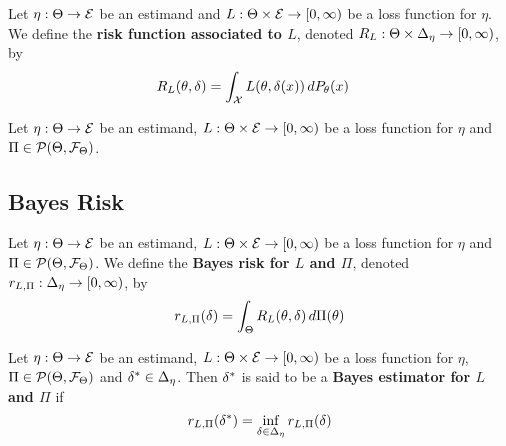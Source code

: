 \documentclass{book}
\begin{document}
	\begin{defn}
		Let $\eta: \Theta \rightarrow \mathcal{E}$ be an estimand and $L: \Theta \times \mathcal{E} \rightarrow [0,\infty)$ be a loss function for $\eta$. We define the \textbf{risk function associated to $L$}, denoted $R_L: \Theta \times \Delta_{\eta} \rightarrow [0,\infty)$, by 
		\begin{align*}
			R_L(\theta, \delta) 
			& = \int_{\mathcal{X}} L(\theta, \delta(x)) \, d P_{\theta}(x)
		\end{align*}
	\end{defn}
	
	\begin{defn}
		Let $\eta: \Theta \rightarrow \mathcal{E}$ be an estimand, $L: \Theta \times \mathcal{E} \rightarrow [0,\infty)$ be a loss function for $\eta$ and $\Pi \in \mathcal{P}(\Theta, \mathcal{F}_{\Theta})$. 
	\end{defn}
	
	
	
	
	
	
	
	
	
	
	
	
	
	
	
	
	
	
	
	
	
	
	
	\subsection{Bayes Risk}
	
	\begin{defn}
		Let $\eta: \Theta \rightarrow \mathcal{E}$ be an estimand, $L: \Theta \times \mathcal{E} \rightarrow [0,\infty)$ be a loss function for $\eta$ and $\Pi \in \mathcal{P}(\Theta, \mathcal{F}_{\Theta})$. We define the \textbf{Bayes risk for $L$ and $\Pi$}, denoted $r_{L, \Pi}: \Delta_{\eta} \rightarrow [0,\infty)$, by 
		$$r_{L, \Pi}(\delta) = \int_{\Theta} R_L(\theta, \delta) \, d \Pi(\theta)$$
	\end{defn}

	\begin{defn}
		Let $\eta: \Theta \rightarrow \mathcal{E}$ be an estimand, $L: \Theta \times \mathcal{E} \rightarrow [0,\infty)$ be a loss function for $\eta$, $\Pi \in \mathcal{P}(\Theta, \mathcal{F}_{\Theta})$ and $\delta^* \in \Delta_{\eta}$. Then $\delta^*$ is said to be a \textbf{Bayes estimator for $L$ and $\Pi$} if 
		$$r_{L, \Pi}(\delta^*) = \inf_{\delta \in \Delta_{\eta}}r_{L, \Pi}(\delta)$$
	\end{defn}
	
	
	
\end{document}

